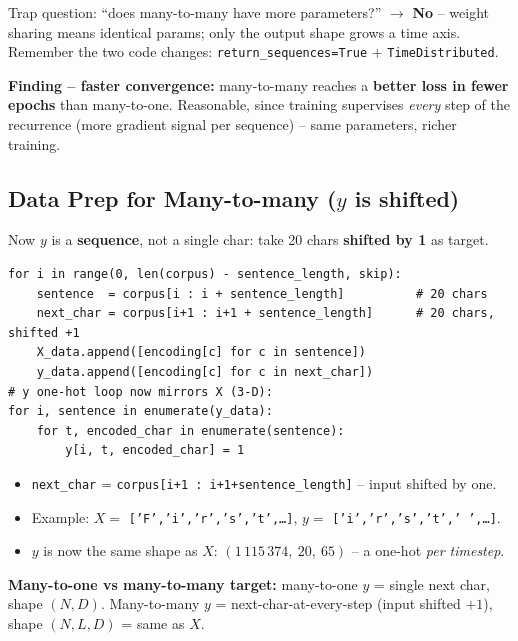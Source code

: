\documentclass[10pt,a4paper]{article}
\begin{document}
	\begin{examtipbox}
		Trap question: ``does many-to-many have more parameters?'' $\rightarrow$ \textbf{No} -- weight sharing means identical params; only the output shape grows a time axis. Remember the two code changes: \texttt{return\_sequences=True} + \texttt{TimeDistributed}.
	\end{examtipbox}

	\begin{importantbox}
		\textbf{Finding -- faster convergence:} many-to-many reaches a \textbf{better loss in fewer epochs} than many-to-one. Reasonable, since training supervises \emph{every} step of the recurrence (more gradient signal per sequence) -- same parameters, richer training.
	\end{importantbox}

	\subsection{Data Prep for Many-to-many ($y$ is shifted)}

	Now $y$ is a \textbf{sequence}, not a single char: take 20 chars \textbf{shifted by 1} as target.

	\begin{verbatim}
for i in range(0, len(corpus) - sentence_length, skip):
    sentence  = corpus[i : i + sentence_length]          # 20 chars
    next_char = corpus[i+1 : i+1 + sentence_length]      # 20 chars, shifted +1
    X_data.append([encoding[c] for c in sentence])
    y_data.append([encoding[c] for c in next_char])
# y one-hot loop now mirrors X (3-D):
for i, sentence in enumerate(y_data):
    for t, encoded_char in enumerate(sentence):
        y[i, t, encoded_char] = 1
	\end{verbatim}

	\begin{itemize}[leftmargin=*]
		\item \texttt{next\_char} = \texttt{corpus[i+1 : i+1+sentence\_length]} -- input shifted by one.
		\item Example: $X=$ \texttt{['F','i','r','s','t',\dots]}, \; $y=$ \texttt{['i','r','s','t',' ',\dots]}.
		\item $y$ is now the same shape as $X$: $(1\,115\,374,\ 20,\ 65)$ -- a one-hot \emph{per timestep}.
	\end{itemize}

	\begin{importantbox}
		\textbf{Many-to-one vs many-to-many target:} many-to-one $y$ = single next char, shape $(N,D)$. Many-to-many $y$ = next-char-at-every-step (input shifted $+1$), shape $(N,L,D)$ = same as $X$.
	\end{importantbox}
\end{document}
